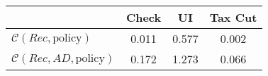 \begin{tabular}{@{}lccc@{}} 
\toprule 
                          & Check      & UI    & Tax Cut    \\  \midrule 
$\mathcal{C}(Rec,\text{policy})$ & 0.011  & 0.577  & 0.002     \\ 
$\mathcal{C}(Rec, AD,\text{policy})$ & 0.172  & 1.273  & 0.066     \\ 
\end{tabular}  
